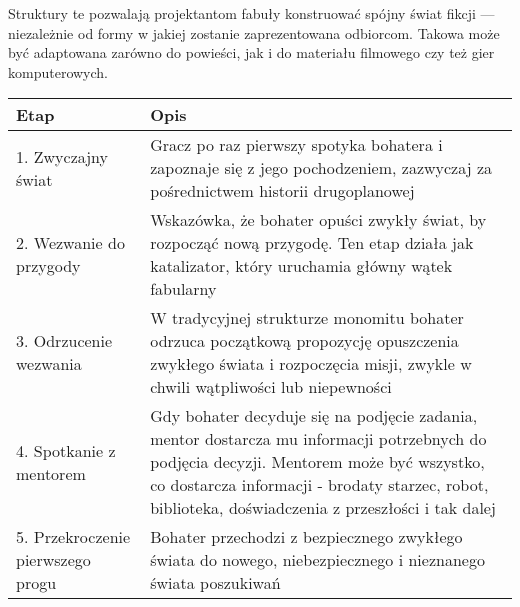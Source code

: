 Struktury te pozwalają projektantom fabuły konstruować spójny świat fikcji --- niezależnie od formy w
jakiej zostanie zaprezentowana odbiorcom. Takowa może być adaptowana zarówno do powieści, jak i do materiału
filmowego czy też gier komputerowych.

\begin{table}[h!]
    \begin{center}
        \begin{tabular}{p{1.5in} p{4in}}
            \hline
            Etap                                & Opis                                                                                                                                                                                                                                                                                                                            \\
            \hline
            1. Zwyczajny świat                  & Gracz po raz pierwszy spotyka bohatera i zapoznaje się z jego pochodzeniem, zazwyczaj za pośrednictwem historii drugoplanowej                                                                                                                                                                                                   \\
            2. Wezwanie do przygody             & Wskazówka, że bohater opuści zwykły świat, by rozpocząć nową przygodę. Ten etap działa jak katalizator, który uruchamia główny wątek fabularny                                                                                                                                                                                  \\
            3. Odrzucenie wezwania              & W tradycyjnej strukturze monomitu bohater odrzuca początkową propozycję opuszczenia zwykłego świata i rozpoczęcia misji, zwykle w chwili wątpliwości lub niepewności                                                                                                                                                            \\
            4. Spotkanie z mentorem             & Gdy bohater decyduje się na podjęcie zadania, mentor dostarcza mu informacji potrzebnych do podjęcia decyzji. Mentorem może być wszystko, co dostarcza informacji - brodaty starzec, robot, biblioteka, doświadczenia z przeszłości i tak dalej                                                                                 \\
            5. Przekroczenie pierwszego progu   & Bohater przechodzi z bezpiecznego zwykłego świata do nowego, niebezpiecznego i nieznanego świata poszukiwań                                                                                                                                                                                                                     \\

\end{tabular}
\end{center}
\end{table}
